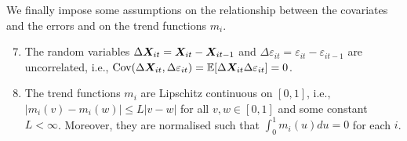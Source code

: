 \documentclass[12pt]{article}
\begin{document}
We finally impose some assumptions on the relationship between the covariates and the errors and on the trend functions $m_i$.
\begin{enumerate}[label=(C\arabic*),leftmargin=1.05cm, itemsep=0pt, parsep=0pt, topsep=3pt]
\setcounter{enumi}{6}
\item \label{C-reg-err} The random variables $\Delta \boldsymbol{X}_{it} = \boldsymbol{X}_{it} - \boldsymbol{X}_{it-1}$ and $\Delta \varepsilon_{it} = \varepsilon_{it} - \varepsilon_{it-1}$ are uncorrelated, i.e., $\textnormal{Cov}(\Delta \boldsymbol{X}_{it}, \Delta \varepsilon_{it}) = \mathbb{E}[\Delta \boldsymbol{X}_{it} \Delta \varepsilon_{it}] = 0$. 
\item \label{C-trend} The trend functions $m_i$ are Lipschitz continuous on $[0,1]$, i.e., $|m_i(v) - m_i(w)| \le L |v-w|$ for all $v,w \in [0,1]$ and some constant $L < \infty$. Moreover, they are normalised such that $\int_0^1m_i (u)du = 0$ for each $i$.
\end{enumerate}
\end{document}
